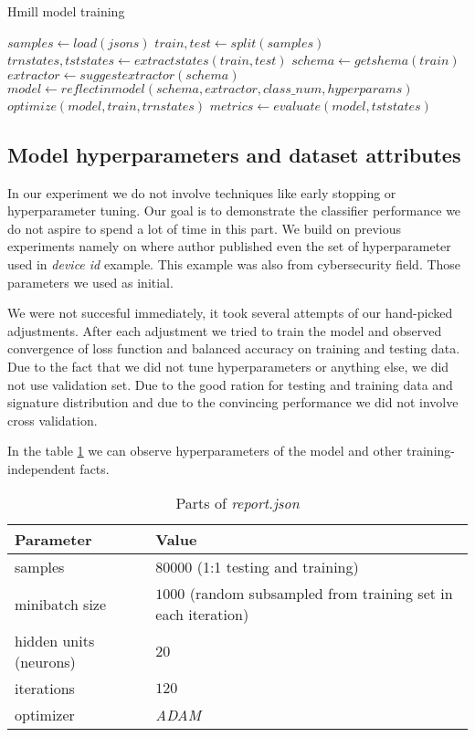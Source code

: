 \begin{algorithm}
  \caption{Hmill model training}\label{algo:hmillbinary}
  \begin{algorithmic}
      \State $samples \gets load(jsons)$
      \State $train,test \gets split(samples)$
      \State $trnstates,tststates \gets extractstates(train, test)$
      \State $schema \gets getshema(train)$
      \State $extractor \gets suggestextractor(schema)$
      \State $model \gets reflectinmodel(schema, extractor, class\_num, hyperparams)$
      \State $optimize(model, train, trnstates)$
      \State $metrics \gets evaluate(model, tststates)$
      \EndProcedure
  \end{algorithmic}
\end{algorithm}

\subsection{Model hyperparameters and dataset attributes}
In our experiment we do not involve techniques like early stopping or hyperparameter tuning. Our goal is to demonstrate the classifier performance we do not aspire to spend a lot of time in this part. We build on previous experiments namely on \cite{Mandlik2020} where author published even the set of hyperparameter used in \emph{device id} example. This example was also from cybersecurity field. Those parameters we used as initial.

We were not succesful immediately, it took several attempts of our hand-picked adjustments. After each adjustment we tried to train the model and observed convergence of loss function and balanced accuracy on training and testing data. Due to the fact that we did not tune hyperparameters or anything else, we did not use validation set. Due to the good ration for testing and training data and signature distribution and due to the convincing performance we did not involve cross validation.

In the table \ref{tab:hyperparams} we can observe hyperparameters of the model and other training-independent facts.


\begin{table}[h]
  \centering
  \caption{Parts of \emph{report.json}}
  \begin{tabular}{p{6cm}p{8cm}} 
      \toprule
      \textbf{Parameter} &
      \textbf{Value} \\
      \midrule
      samples & $80000$ (1:1 testing and training) \\
      \midrule
      minibatch size & $1000$ (random subsampled from training set in each iteration)\\
      \midrule
      hidden units (neurons)& $20$\\
      \midrule
      iterations & $120$\\
      \midrule
      optimizer & \emph{ADAM} \cite{Kingma2014}\\
      \bottomrule
  \end{tabular}
  \label{tab:hyperparams}
\end{table}


